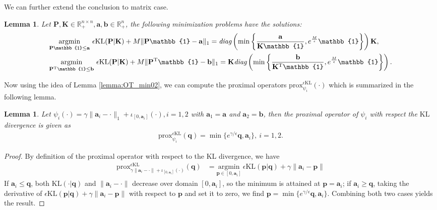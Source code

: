 \documentclass[11pt]{book}
\newtheorem{lemma}[theorem]{Lemma}
\begin{document}
We can further extend the conclusion to matrix case.
\begin{lemma}
Let $\mathbf{P}, \mathbf{K}\in\mathbb{R}_+^{n\times n}, \mathbf{a}, \mathbf{b}\in\mathbb{R}_+^n$, the following minimization problems have the solutions:
\begin{align}
& \underset{\mathbf{P}\mathbb{1} \leq \mathbf{a}}{\mathrm{argmin}}\ \epsilon\mathrm{KL}(\mathbf{P}|\mathbf{K}) + M \| \mathbf{P}\mathbb{1} -\mathbf{a} \|_1 = \emph{diag}\left(\min\left\{ \frac{\mathbf{a}}{\mathbf{K}\mathbb{1}}, e^{\frac{M}{\epsilon}}\mathbb{1} \right\} \right) \mathbf{K}, \\
&\underset{\mathbf{P}^{\mathrm{T}}\mathbb{1}\le \mathbf{b}}{\mathrm{argmin}}\ \epsilon\mathrm{KL}(\mathbf{P}|\mathbf{K}) + M \| \mathbf{P}^{\mathrm{T}}\mathbb{1} -\mathbf{b} \|_1 = \mathbf{K} \emph{diag}\left(\min\left\{ \frac{\mathbf{b}}{\mathbf{K}^{\mathrm{T}}\mathbb{1}}, e^{\frac{M}{\epsilon}}\mathbb{1} \right\} \right).
\end{align}
\end{lemma}



Now using the idea of Lemma \ref{lemma:OT_min02}, we can compute the proximal operators $\mathrm{prox}_{\psi_i}^{\epsilon\mathrm{KL}}(\cdot)$ which is summarized in the following lemma.

\begin{lemma}\label{lemma:prox_OptionI}
    Let $\psi_i(\cdot) = \gamma \|\mathbf{a}_i-\cdot\|_1 + \iota_{[0,\mathbf{a}_i]}(\cdot), i = 1, 2$ with $\mathbf{a}_1=\mathbf{a}$ and $\mathbf{a}_2 = \mathbf{b}$, then the proximal operator of $\psi_i$ with respect the $\mathrm{KL}$ divergence is given as
    \begin{align}
    \mathrm{prox}_{\psi_i}^{\epsilon\mathrm{KL}} (\mathbf{q}) = \min\{e^{\gamma/\epsilon}\mathbf{q}, \mathbf{a}_i\}, \ i = 1, 2.
    \end{align}
\end{lemma}

\begin{proof}
    By definition of the proximal operator with respect to the KL divergence, we have
    \begin{align*}
    \mathrm{prox}_{\gamma\|\textbf{a}_i-\cdot\| + \iota_{[0,\textbf{a}_i]}(\cdot)}^{\epsilon\mathrm{KL}}(\mathbf{q}) &= 
    \underset{\mathbf{p}\in[0,\mathbf{a}_i]}{\mathrm{argmin}}\ \epsilon\mathrm{KL}(\mathbf{p}|\mathbf{q}) + \gamma\|\textbf{a}_i-\textbf{p}\|
    \end{align*}
    If $\mathbf{a}_i\le \mathbf{q}$, both $\mathrm{KL}(\cdot|\mathbf{q})$ and $\|\mathbf{a}_i-\cdot\|$ decrease over domain $[0,\mathbf{a}_i]$, so the minimum is attained at $\mathbf{p} = \mathbf{a}_i$; if $\mathbf{a}_i \ge \mathbf{q}$, taking the derivative of $\epsilon\mathrm{KL}(\mathbf{p}|\mathbf{q}) + \gamma\|\mathbf{a}_i-\mathbf{p}\|$ with respect to $\mathbf{p}$ and set it to zero, we find $\mathbf{p} = \min\{e^{\gamma/\epsilon}\mathbf{q}, \mathbf{a}_i\}$. Combining both two cases yields the result.
\end{proof}
\end{document}

